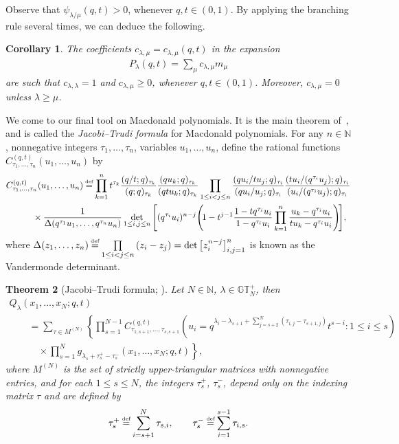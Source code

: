 \documentclass[pdftex]{sigma}
\numberwithin{equation}{section}
\newcommand\myeq{\mathrel{\stackrel{\makebox[0pt]{\mbox{\normalfont\tiny def}}}{=}}}
\newtheorem{thm}{Theorem}[section]
\newtheorem{cor}[thm]{Corollary}
\newcommand{\N}{\mathbb{N}}
\newcommand{\GTp}{\mathbb{GT}^+}
\begin{document}
Observe that $\psi_{\lambda/\mu}(q, t) > 0$, whenever $q, t \in (0, 1)$. By applying the branching rule several times, we can deduce the following.

\begin{cor}\label{cor:branchingrule}
The coefficients $c_{\lambda, \mu} = c_{\lambda, \mu}(q, t)$ in the expansion
\begin{gather*}
P_{\lambda}(q, t) = \sum_{\mu}{c_{\lambda, \mu}m_{\mu}}
\end{gather*}
are such that $c_{\lambda, \lambda} = 1$ and $c_{\lambda, \mu} \geq 0$, whenever $q, t \in (0, 1)$. Moreover, $c_{\lambda, \mu} = 0$ unless $\lambda \geq \mu$.
\end{cor}

We come to our f\/inal tool on Macdonald polynomials. It is the main theorem of~\cite{LS}, and is called the \textit{Jacobi--Trudi formula} for Macdonald polynomials. For any $n\in\N$, nonnegative integers $\tau_1, \dots, \tau_n$, variables $u_1, \dots, u_n$, def\/ine the rational functions $C_{\tau_1, \dots, \tau_n}^{(q, t)}(u_1, \dots, u_n)$ by
\begin{gather}
C_{\tau_1, \dots, \tau_n}^{(q, t)}(u_1, \dots, u_n) \myeq \prod_{k=1}^n{t^{\tau_k}\frac{(q/t; q)_{\tau_k}}{(q; q)_{\tau_k}}\frac{(qu_k; q)_{\tau_k}}{(qtu_k; q)_{\tau_k}}}\prod_{1\leq i<j\leq n}{\frac{(qu_i/tu_j; q)_{\tau_i}}{(qu_i/u_j; q)_{\tau_i}}\frac{(tu_i/(q^{\tau_i}u_j); q)_{\tau_i}}{(u_i/(q^{\tau_i}u_j); q)_{\tau_i}}}\nonumber\\
\qquad{} \times\frac{1}{\Delta(q^{\tau_1}u_1, \dots, q^{\tau_n}u_n)}\det_{1\leq i, j\leq n}{\left[ (q^{\tau_i}u_i)^{n-j}\!\left(\! 1 - t^{j-1}\frac{1 - tq^{\tau_i}u_i}{1 - q^{\tau_i}u_i}\prod_{k=1}^n{\frac{u_k - q^{\tau_i}u_i}{tu_k - q^{\tau_i}u_i}} \right) \!\right]},\!\!\!\label{Ccoeff}
\end{gather}
where $\Delta(z_1, \dots, z_n) \myeq \prod\limits_{1\leq i < j\leq n}{(z_i - z_j)} = \det\big[ z_i^{n-j} \big]_{i, j=1}^n$ is known as the Vandermonde determinant.

\begin{thm}[{Jacobi--Trudi formula; \cite[Theorem~5.1]{LS}}]\label{jacobitrudi}
Let $N\in\N$, $\lambda\in\GTp_N$, then
\begin{gather*}
Q_{\lambda}(x_1, \dots, x_N; q, t)\\
 \qquad{} = \sum_{\tau\in M^{(N)}}\left\{ \prod_{s = 1}^{N-1}{C^{(q, t)}_{\tau_{1, s+1}, \dots, \tau_{s, s+1}}\left( u_i = q^{\lambda_i - \lambda_{s+1} + \sum\limits_{j=s+2}^N{(\tau_{i, j} - \tau_{s+1, j})}}t^{s-i}\colon 1\leq i\leq s \right) }\right.\\
\left.\qquad\quad{} \times\prod_{s=1}^N{g_{\lambda_s + \tau_s^+ - \tau_s^-}(x_1, \dots, x_N; q, t)} \right\},
\end{gather*}
where $M^{(N)}$ is the set of strictly upper-triangular matrices with nonnegative entries, and for each $1\leq s\leq N$, the integers $\tau_s^+$, $\tau_s^-$, depend only on the indexing matrix $\tau$ and are defined by
\begin{gather}\label{tauplusminus}
\tau_s^+ \myeq \sum_{i=s+1}^N{\tau_{s, i}}, \qquad \tau_s^- \myeq \sum_{i=1}^{s - 1}{\tau_{i, s}}.
\end{gather}
\end{thm}
\end{document}
